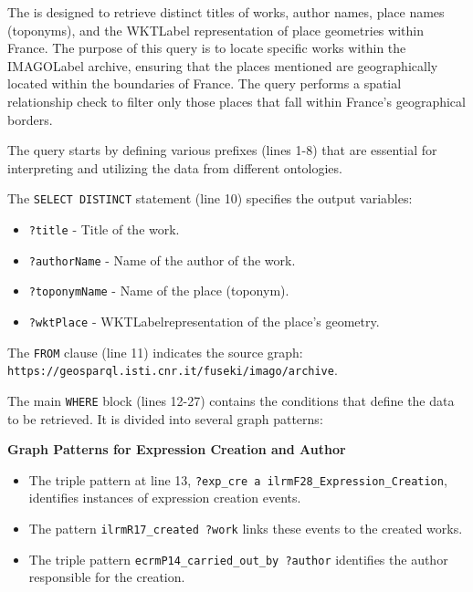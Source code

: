 

The  is designed to retrieve distinct titles of works, author names, place names (toponyms), and the \acrshort{WKTLabel} representation of place geometries within France. The purpose of this query is to locate specific works within the \acrshort{IMAGOLabel} archive, ensuring that the places mentioned are geographically located within the boundaries of France. The query performs a spatial relationship check to filter only those places that fall within France’s geographical borders.

The query starts by defining various prefixes (lines 1-8) that are essential for interpreting and utilizing the data from different ontologies. 

The \texttt{SELECT DISTINCT} statement (line 10) specifies the output variables:
\begin{itemize}
    \item \texttt{?title} - Title of the work.
    \item \texttt{?authorName} - Name of the author of the work.
    \item \texttt{?toponymName} - Name of the place (toponym).
    \item \texttt{?wktPlace} - \acrshort{WKTLabel}representation of the place's geometry.
\end{itemize}

The \texttt{FROM} clause (line 11) indicates the source graph:\\
\texttt{https://geosparql.isti.cnr.it/fuseki/imago/archive}.

The main \texttt{WHERE} block (lines 12-27) contains the conditions that define the data to be retrieved. It is divided into several graph patterns:

\textbf{Graph Patterns for Expression Creation and Author}
\begin{itemize}
    \item The triple pattern at line 13, \texttt{?exp\_cre a \gls{ilrm}F28\_Expression\_Creation}, identifies instances of expression creation events.
    \item The pattern \texttt{\gls{ilrm}R17\_created ?work} links these events to the created works.
    \item The triple pattern \texttt{\gls{ecrm}P14\_carried\_out\_by ?author} identifies the author responsible for the creation.
\end{itemize}

